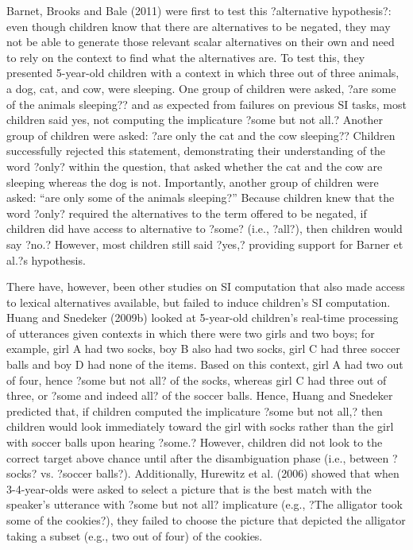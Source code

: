 Barnet, Brooks and Bale (2011) were first to test this ?alternative hypothesis?: even though children know that there are alternatives to be negated, they may not be able to generate those relevant scalar alternatives on their own and need to rely on the context to find what the alternatives are. To test this, they presented 5-year-old children with a context in which three out of three animals, a dog, cat, and cow, were sleeping. One group of children were asked, ?are some of the animals sleeping?? and as expected from failures on previous SI tasks, most children said yes, not computing the implicature ?some but not all.? Another group of children were asked: ?are only the cat and the cow sleeping?? Children successfully rejected this statement, demonstrating their understanding of the word ?only? within the question, that asked whether the cat and the cow are sleeping whereas the dog is not. Importantly, another group of children were asked: ``are only some of the animals sleeping?'' Because children knew that the word ?only? required the alternatives to the term offered to be negated, if children did have access to alternative to ?some? (i.e., ?all?), then children would say ?no.? However, most children still said ?yes,? providing support for Barner et al.?s hypothesis.  

There have, however, been other studies on SI computation that also made access to lexical alternatives available, but failed to induce children's SI computation. Huang and Snedeker (2009b) looked at 5-year-old children's real-time processing of utterances given contexts in which there were two girls and two boys; for example, girl A had two socks, boy B also had two socks, girl C had three soccer balls and boy D had none of the items. Based on this context, girl A had two out of four, hence ?some but not all? of the socks, whereas girl C had three out of three, or ?some and indeed all? of the soccer balls. Hence, Huang and Snedeker predicted that, if children computed the implicature ?some but not all,? then children would look immediately toward the girl with socks rather than the girl with soccer balls upon hearing ?some.? However, children did not look to the correct target above chance until after the disambiguation phase (i.e., between ?socks? vs. ?soccer balls?). Additionally, Hurewitz et al. (2006) showed that when 3-4-year-olds were asked to select a picture that is the best match with the speaker's utterance with ?some but not all? implicature (e.g., ?The alligator took some of the cookies?), they failed to choose the picture that depicted the alligator taking a subset (e.g., two out of four) of the cookies. 

